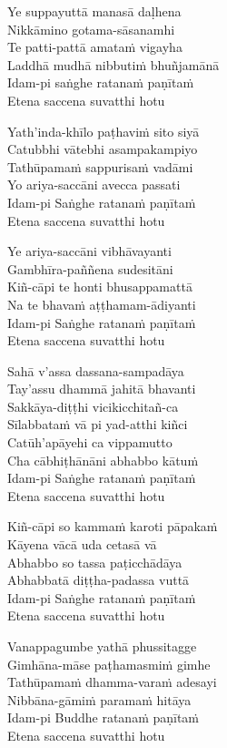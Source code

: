 \begin{paritta}
%
Ye suppayuttā manasā daḷhena\\
Nikkāmino gotama-sāsanamhi\\
Te patti-pattā amataṁ vigayha\\
Laddhā mudhā nibbutiṁ bhuñjamānā\\
Idam-pi saṅghe ratanaṁ paṇītaṁ\\
Etena saccena suvatthi hotu

Yath'inda-khīlo paṭhaviṁ sito siyā\\
Catubbhi vātebhi asampakampiyo\\
Tathūpamaṁ sappurisaṁ vadāmi\\
Yo ariya-saccāni avecca passati\\
Idam-pi Saṅghe ratanaṁ paṇītaṁ\\
Etena saccena suvatthi hotu

Ye ariya-saccāni vibhāvayanti\\
Gambhīra-paññena sudesitāni\\
Kiñ-cāpi te honti bhusappamattā\\
Na te bhavaṁ aṭṭhamam-ādiyanti\\
Idam-pi Saṅghe ratanaṁ paṇītaṁ\\
Etena saccena suvatthi hotu

Sahā v'assa dassana-sampadāya\\
Tay'assu dhammā jahitā bhavanti\\
Sakkāya-diṭṭhi vicikicchitañ-ca\\
Sīlabbataṁ vā pi yad-atthi kiñci\\
Catūh'apāyehi ca vippamutto\\
Cha cābhiṭhānāni abhabbo kātuṁ\\
Idam-pi Saṅghe ratanaṁ paṇītaṁ\\
Etena saccena suvatthi hotu

Kiñ-cāpi so kammaṁ karoti pāpakaṁ\\
Kāyena vācā uda cetasā vā\\
Abhabbo so tassa paṭicchādāya\\
Abhabbatā diṭṭha-padassa vuttā\\
Idam-pi Saṅghe ratanaṁ paṇītaṁ\\
Etena saccena suvatthi hotu

Vanappagumbe yathā phussitagge\\
Gimhāna-māse paṭhamasmiṁ gimhe\\
Tathūpamaṁ dhamma-varaṁ adesayi\\
Nibbāna-gāmiṁ paramaṁ hitāya\\
Idam-pi Buddhe ratanaṁ paṇītaṁ\\
Etena saccena suvatthi hotu


\end{paritta}
